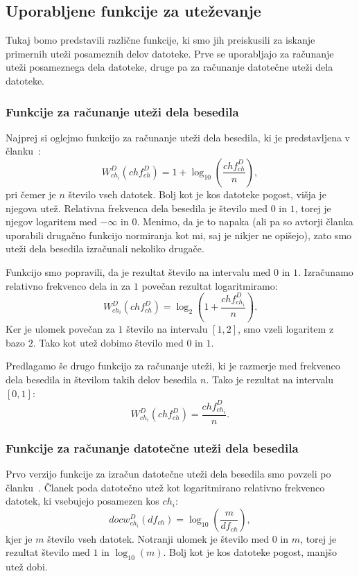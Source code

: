 \documentclass{acm_proc_article-sp}
\begin{document}
\subsection{Uporabljene funkcije za uteževanje}
\label{weight-functions}

Tukaj bomo predstavili različne funkcije, ki smo jih preiskusili za iskanje primernih uteži posameznih delov datoteke. Prve se uporabljajo za računanje uteži posameznega dela datoteke, druge pa za računanje datotečne uteži dela datoteke.

\subsubsection{Funkcije za računanje uteži dela besedila}\label{utezivclanku}
Najprej si oglejmo funkcijo za računanje uteži dela besedila, ki je predstavljena v članku~\cite{fbhash}:
\[ W_{ch_i}^{D}(ch f_{ch}^D) = 1 + \log_{10}\left(\frac{ch f_{ch}^D}{n}\right),\]
pri čemer je $n$ število vseh datotek. Bolj kot je kos datoteke pogost, višja je njegova utež. Relativna frekvenca dela besedila je število med $0$ in $1$, torej je njegov logaritem med $-\infty$ in $0$. Menimo, da je to napaka (ali pa so avtorji članka uporabili drugačno funkcijo normiranja kot mi, saj je nikjer ne opišejo), zato smo uteži dela besedila izračunali nekoliko drugače.

Funkcijo smo popravili, da je rezultat število na intervalu med $0$ in $1$. Izračunamo relativno frekvenco dela in za $1$ povečan rezultat logaritmiramo:
\[ W_{ch_i}^{D}(ch f_{ch}^D) = \log_2\left(1 + \frac{ch f_{ch_i}^D}{n}\right). \]
Ker je ulomek povečan za $1$ število na intervalu $[1, 2]$, smo vzeli logaritem z bazo $2$. Tako kot utež dobimo število med $0$ in $1$. 

Predlagamo še drugo funkcijo za računanje uteži, ki je razmerje med frekvenco dela besedila in številom takih delov besedila $n$. Tako je rezultat na intervalu $[0,1]$:
\[ W_{ch_i}^{D}(ch f_{ch}^D) = \frac{ch f_{ch_i}^D}{n}. \]

\subsubsection{Funkcije za računanje datotečne uteži dela besedila}
Prvo verzijo funkcije za izračun datotečne uteži dela besedila smo povzeli po članku~\cite{fbhash}. Članek poda datotečno utež kot logaritmirano relativno frekvenco datotek, ki vsebujejo posamezen kos $ch_i$:
\[ docw_{ch_i}^{D}(df_{ch}) = \log_{10}\left(\frac{m}{df_{ch}}\right), \]
kjer je $m$ število vseh datotek. Notranji ulomek je število med $0$ in $m$, torej je rezultat število med $1$ in $\log_{10}(m)$. Bolj kot je kos datoteke pogost, manjšo utež dobi.
\end{document}
